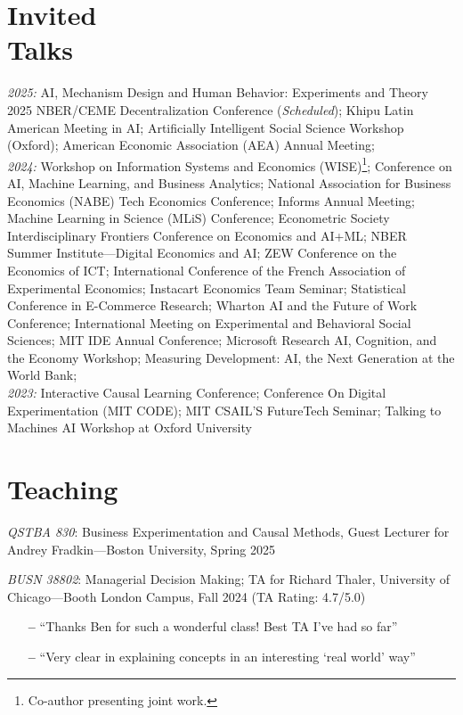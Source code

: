 \documentclass[margin,line,pifont,palatino,courier, 9pt]{res}
\begin{document}
\begin{resume}
\section{\sc Invited\\Talks}
\textit{2025:} 
AI, Mechanism Design and Human Behavior: Experiments and Theory 2025 NBER/CEME Decentralization Conference (\textit{Scheduled});
Khipu Latin American Meeting in AI;
Artificially Intelligent Social Science Workshop (Oxford);
American Economic Association (AEA) Annual Meeting;\vspace{2mm}\\
\textit{2024:} Workshop on Information Systems and Economics (WISE)\footnote{Co-author presenting joint work.};
Conference on AI, Machine Learning, and Business Analytics;
National Association for Business Economics (NABE) Tech Economics Conference; 
Informs Annual Meeting\footnotemark[\value{footnote}];
Machine Learning in Science (MLiS) Conference;
Econometric Society Interdisciplinary Frontiers Conference on Economics and AI+ML; 
NBER Summer Institute---Digital Economics and AI\footnotemark[\value{footnote}];
ZEW Conference on the Economics of ICT;
International Conference of the French Association of Experimental Economics;
Instacart Economics Team Seminar;
Statistical Conference in E-Commerce Research;
Wharton AI and the Future of Work Conference; 
International Meeting on Experimental and Behavioral Social Sciences;
MIT IDE Annual Conference; 
Microsoft Research AI, Cognition, and the Economy Workshop; 
Measuring Development: AI, the Next Generation at the World Bank; 
\vspace{2mm}\\
\textit{2023:} Interactive Causal Learning Conference; 
Conference On Digital Experimentation (MIT CODE); 
MIT CSAIL'S FutureTech Seminar;
Talking to Machines AI Workshop at Oxford University

\section{\sc Teaching}
\textit{QSTBA 830}: Business Experimentation and Causal Methods, Guest Lecturer for Andrey Fradkin---Boston University, Spring 2025

\textit{BUSN 38802}: Managerial Decision Making; TA for Richard Thaler, University of Chicago---Booth London Campus, Fall 2024 (TA Rating: 4.7/5.0)
\vspace{2mm}
\begin{itemize}\setlength{\itemsep}{0pt}
    \small
    \item[\textbf{--}] ``Thanks Ben for such a wonderful class! Best TA I've had so far''
    \item[\textbf{--}] ``Very clear in explaining concepts in an interesting `real world' way''
\end{itemize}


\end{resume}
\end{document}
